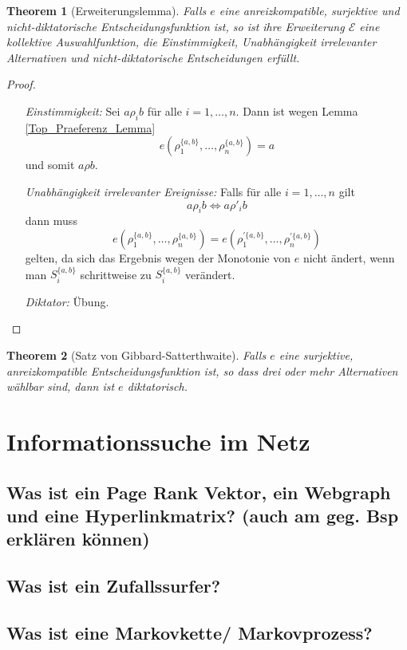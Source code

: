 \documentclass[]{article}
\newtheorem{thm}{Theorem}
\begin{document}
\begin{thm}[Erweiterungslemma]
	Falls $e$ eine anreizkompatible, surjektive und nicht-diktatorische Entscheidungsfunktion ist, so ist ihre Erweiterung $\mathcal{E}$ eine kollektive Auswahlfunktion, die Einstimmigkeit, Unabhängigkeit irrelevanter Alternativen und nicht-diktatorische Entscheidungen erfüllt.
\end{thm}
\begin{proof}~
	\begin{itemize}
		\item[\it Einstimmigkeit:] Sei $a \rho_i b$ für alle $i=1, \dots, n$. Dann ist wegen Lemma \ref{Top_Praeferenz_Lemma} 
		\[e\left(\rho_1^{\{a, b \}}, \dots, \rho_n^{\{a, b \}} \right) = a\] 
		und somit $a \rho b$.
		\item[\it Unabhängigkeit irrelevanter Ereignisse:] Falls für alle $i = 1, \dots, n$ gilt
		\[a \rho_i b \Leftrightarrow a \rho'_i b \]
		dann muss
		\[e\left(\rho_1^{\{a, b \}}, \dots, \rho_n^{\{a, b \}} \right) 
		= 
		e\left(\rho_1^{\prime \{a, b \}}, \dots, \rho_n^{\prime \{a, b \}} \right) \]
		gelten, da sich das Ergebnis wegen der Monotonie von $e$ nicht ändert, wenn man $S_i^{\{a,b\}}$ schrittweise zu $S_i^{\{a,b\}}$ verändert.
		\item[\it Diktator:] Übung.
	\end{itemize}
\end{proof}

\begin{thm}[Satz von Gibbard-Satterthwaite]
	Falls $e$ eine surjektive, anreizkompatible Entscheidungsfunktion ist, so dass drei oder mehr Alternativen wählbar sind, dann ist $e$ diktatorisch.
\end{thm}

\section{Informationssuche im Netz}

\subsection*{Was ist ein Page Rank Vektor, ein Webgraph und eine Hyperlinkmatrix? (auch am geg. Bsp erklären können)}

\subsection*{Was ist ein Zufallssurfer? }

\subsection*{Was ist eine Markovkette/ Markovprozess? }
\end{document}
